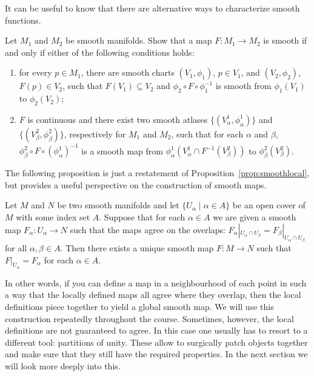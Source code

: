 It can be useful to know that there are alternative ways to characterize smooth functions.
\begin{exercise}\label{prop:eq-def-smooth}
	Let $M_1$ and $M_2$ be smooth manifolds.
	Show that a map $F:M_1\to M_2$ is smooth if and only if either of the following conditions holds:
	\begin{enumerate}
		\item for every $p\in M_1$, there are smooth charts $(V_1,\phi_1)$, $p\in V_1$, and $(V_2,\phi_2)$, $F(p) \in V_2$, such that $F(V_1) \subseteq V_2$ and $\phi_2 \circ F \circ \phi_1^{-1}$ is smooth from $\phi_1(V_1)$ to $\phi_2(V_2)$;
		\item $F$ is continuous and there exist two smooth atlases $\{(V^1_\alpha, \phi^1_\alpha)\}$ and $\{(V^2_\beta, \phi^2_\beta)\}$, respectively for $M_1$ and $M_2$, such that for each $\alpha$ and $\beta$, $\phi^2_\beta \circ F \circ (\phi^1_\alpha)^{-1}$ is a smooth map from $\phi^1_\alpha(V^1_\alpha \cap F^{-1}(V_\beta^2))$ to $\phi^2_\beta(V^2_\beta)$.
	\end{enumerate}
\end{exercise}

The following proposition is just a restatement of Proposition~\ref{prop:smoothlocal}, but provides a useful perspective on the construction of smooth maps.

\begin{proposition}
	Let $M$ and $N$ be two smooth manifolds and let $\{U_\alpha\mid\alpha\in A\}$ be an open cover of $M$ with some index set $A$.
	Suppose that for each $\alpha\in A$ we are given a smooth map $F_
		\alpha:U_\alpha\to N$ such that the maps agree on the overlaps: $F_\alpha|_{U_\alpha\cap U_\beta} = F_\beta|_{U_\alpha\cap U_\beta}$ for all $\alpha,\beta\in A$.
	Then there exists a unique smooth map $F:M\to N$ such that $F|_{U_\alpha} = F_\alpha$ for each $\alpha\in A$.
\end{proposition}

In other words, if you can define a map in a neighbourhood of each point in such a way that the locally defined maps all agree where they overlap, then the local definitions piece together to yield a global smooth map.
We will use this construction repeatedly throughout the course.
Sometimes, however, the local definitions are not guaranteed to agree. In this case one usually has to resort to a different tool: partitions of unity.
These allow to surgically patch objects together and make sure that they still have the required properties.
In the next section we will look more deeply into this.

